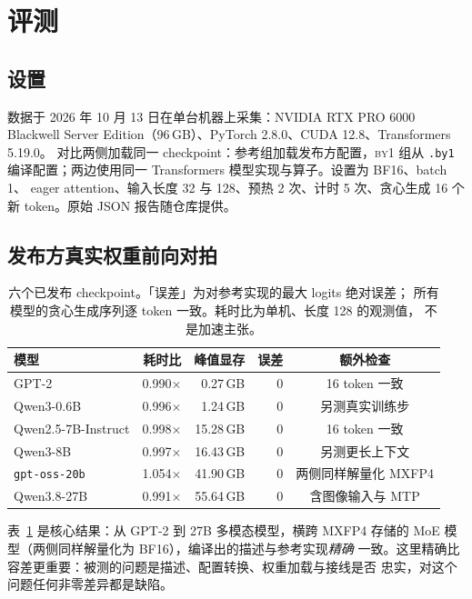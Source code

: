\documentclass[11pt,a4paper]{ctexart}
\newcommand{\code}[1]{\texttt{#1}}
\newcommand{\byone}{\textsc{by1}}
\newcommand{\q}[1]{「#1」}
\begin{document}
\section{评测}
\label{sec:eval}

\subsection{设置}

数据于 2026 年 10 月 13 日在单台机器上采集：NVIDIA RTX PRO 6000 Blackwell
Server Edition（96\,GB）、PyTorch 2.8.0、CUDA 12.8、Transformers 5.19.0。
对比两侧加载同一 checkpoint：参考组加载发布方配置，\byone{} 组从 \code{.by1}
编译配置；两边使用同一 Transformers 模型实现与算子。设置为 BF16、batch 1、
eager attention、输入长度 32 与 128、预热 2 次、计时 5 次、贪心生成 16 个
新 token。原始 JSON 报告随仓库提供。

\subsection{发布方真实权重前向对拍}

\begin{table}[t]
\centering\small
\caption{六个已发布 checkpoint。\q{误差}为对参考实现的最大 logits 绝对误差；
所有模型的贪心生成序列逐 token 一致。耗时比为单机、长度 128 的观测值，
不是加速主张。}
\label{tab:parity}
\begin{tabular}{@{}lrrrc@{}}
\toprule
模型 & 耗时比 & 峰值显存 & 误差 & 额外检查 \\
\midrule
GPT-2 & 0.990$\times$ & 0.27\,GB & 0 & 16 token 一致 \\
Qwen3-0.6B & 0.996$\times$ & 1.24\,GB & 0 & 另测真实训练步 \\
Qwen2.5-7B-Instruct & 0.998$\times$ & 15.28\,GB & 0 & 16 token 一致 \\
Qwen3-8B & 0.997$\times$ & 16.43\,GB & 0 & 另测更长上下文 \\
\code{gpt-oss-20b} & 1.054$\times$ & 41.90\,GB & 0 & 两侧同样解量化 MXFP4 \\
Qwen3.8-27B & 0.991$\times$ & 55.64\,GB & 0 & 含图像输入与 MTP \\
\bottomrule
\end{tabular}
\end{table}

表~\ref{tab:parity} 是核心结果：从 GPT-2 到 27B 多模态模型，横跨 MXFP4
存储的 MoE 模型（两侧同样解量化为 BF16），编译出的描述与参考实现\emph{精确}
一致。这里精确比容差更重要：被测的问题是描述、配置转换、权重加载与接线是否
忠实，对这个问题任何非零差异都是缺陷。
\end{document}
